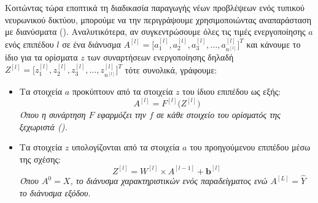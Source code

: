 Κοιτώντας τώρα εποπτικά τη διαδικασία παραγωγής νέων προβλέψεων ενός τυπικού νευρωνικού δικτύου, μπορούμε να την περιγράψουμε χρησιμοποιώντας αναπαράσταση με διανύσματα (). Αναλυτικότερα, αν συγκεντρώσουμε όλες τις τιμές ενεργοποίησης $a$ ενός επιπέδου $l$ σε ένα διάνυσμα \(A^{[l]} = \big[a_1^{[l]}, a_2^{[l]}, a_3^{[l]}, \dots, a_{n^{[l]}}^{[l]}]^T\) και κάνουμε το ίδιο για τα ορίσματα $z$ των συναρτήσεων ενεργοποίησης δηλαδή \(Z^{[l]} = \big[z_1^{[l]}, z_2^{[l]}, z_3^{[l]}, \dots, z_{n^{[l]}}^{[l]}]^T\) τότε συνολικά, γράφουμε:
\begin{itemize}
  \item Τα στοιχεία $a$ προκύπτουν από τα στοιχεία $z$ του ίδιου επιπέδου ως εξής:
    \begin{equation} \label{eq:1}
      A^{[l]} = F^{[l]}\big(Z^{[l]}\big)
    \end{equation}
    \textit{Όπου η συνάρτηση $F$ εφαρμόζει την $f$ σε κάθε στοιχείο του ορίσματός της ξεχωριστά ().}
  \item Τα στοιχεία $z$ υπολογίζονται από τα στοιχεία $a$ του προηγούμενου επιπέδου μέσω της σχέσης:
    \begin{equation} \label{eq:2}
      Z^{[l]} = W^{[l]} \times A^{[l-1]} + \boldsymbol{b}^{[l]}
    \end{equation}
    \textit{Όπου $A^{0} = X$, το διάνυσμα χαρακτηριστικών ενός παραδείγματος ενώ $A^{[L]} = \hat{Y}$ το διάνυσμα εξόδου.}
\end{itemize}

